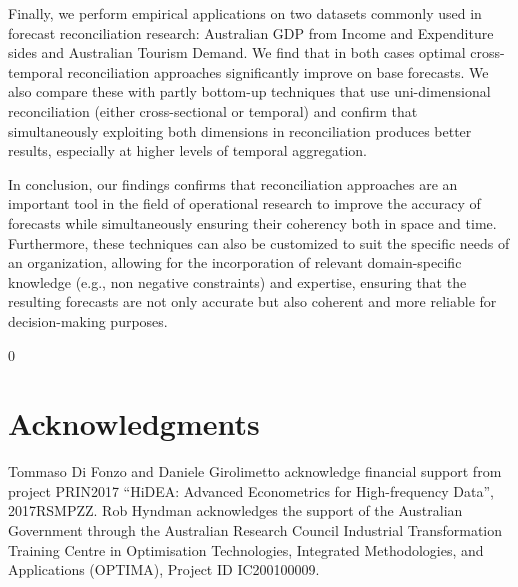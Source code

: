 \documentclass[12pt]{article}
\newcommand{\blind}{0}
\theoremstyle{definition}
\begin{document}
Finally, we perform empirical applications on two datasets commonly used in forecast reconciliation research: Australian GDP from Income and Expenditure sides and Australian Tourism Demand. We find that in both cases optimal cross-temporal reconciliation approaches significantly improve on base forecasts. We also compare these with partly bottom-up techniques that use uni-dimensional reconciliation (either cross-sectional or temporal) and confirm that simultaneously exploiting both dimensions in reconciliation produces better results, especially at higher levels of temporal aggregation. 

In conclusion, our findings confirms that reconciliation approaches are an important tool in the field of operational research to improve the accuracy of forecasts while simultaneously ensuring their coherency both in space and time. Furthermore, these techniques can also be customized to suit the specific needs of an organization, allowing for the incorporation of relevant domain-specific knowledge (e.g., non negative constraints) and expertise, ensuring that the resulting forecasts are not only accurate but also coherent and more reliable for decision-making purposes.


\blind
{
\section*{Acknowledgments}

\noindent Tommaso Di Fonzo and Daniele Girolimetto acknowledge financial support from project PRIN2017 “HiDEA: Advanced Econometrics for High-frequency Data”, 2017RSMPZZ. Rob Hyndman acknowledges the support of the Australian Government through the Australian Research Council Industrial Transformation Training Centre in Optimisation Technologies, Integrated Methodologies, and Applications (OPTIMA), Project ID IC200100009.
} \fi

\begingroup
{}
\setlength{\bibsep}{0pt plus 0.3ex}


\endgroup
\end{document}
